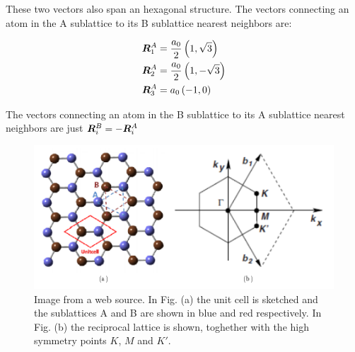 These two vectors also span an hexagonal structure. The vectors connecting an atom in the A sublattice to its B sublattice nearest neighbors are:

\begin{align}
\boldsymbol{R}^A_1 &= \frac{a_0}{2} \left( 1, \sqrt{3} \right) \\
\boldsymbol{R}^A_2 &= \frac{a_0}{2} \left( 1, -\sqrt{3} \right) \\
\boldsymbol{R}^A_3 &= a_0 \left( -1, 0 \right)
\end{align}

The vectors connecting an atom in the B sublattice to its A sublattice nearest neighbors are just $\boldsymbol{R}^B_i = -\boldsymbol{R}^A_i$

\begin{figure}
\centering
  \includegraphics[width=0.7\linewidth]{../Figures/honeycomb_lattice.png}
  \caption{Image from a web source. In Fig. (a) the unit cell is sketched and the sublattices A and B are shown in blue and red respectively. In Fig. (b) the reciprocal lattice is shown, toghether with the high symmetry points $K$, $M$ and $K'$.} 
\label{Fig2.2}
\end{figure}

